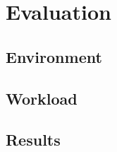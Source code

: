 \chapter{Evaluation}
\label{chp:evaluation}


\lipsum[1]


\section{Environment}
\label{sec:evaluation-environment}

\lipsum[1]


\section{Workload}
\label{sec:evaluation-workload}

\lipsum[1]

\section{Results}
\label{sec:evaluation-results}

\lipsum[1]